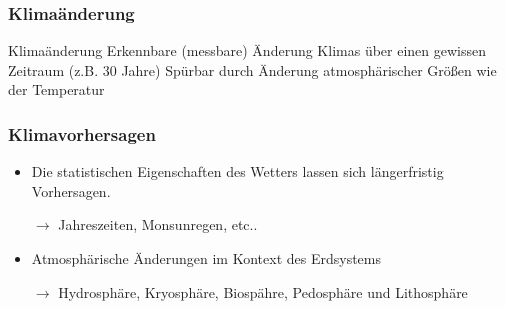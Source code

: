\begin{frame}
	\frametitle{Klimaänderung}
	\begin{block}{Klimaänderung}
		Erkennbare (messbare) Änderung Klimas über einen gewissen Zeitraum (z.B. 30 Jahre) %
		Spürbar durch Änderung atmosphärischer Größen wie der Temperatur
	\end{block}


\end{frame}

\begin{frame}
	\frametitle{Klimavorhersagen} %
	\begin{itemize}
		\item Die statistischen Eigenschaften des Wetters lassen sich längerfristig Vorhersagen.
		\item[$\rightarrow$] Jahreszeiten, Monsunregen, etc.. %
		\item Atmosphärische Änderungen im Kontext des Erdsystems
		\item [$\rightarrow$] Hydrosphäre, Kryosphäre, Biospähre, Pedosphäre und Lithosphäre %
	\end{itemize}
\end{frame}
